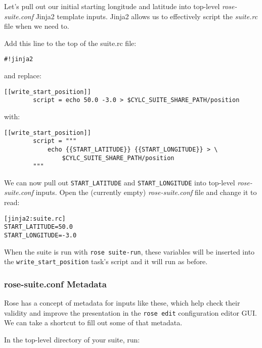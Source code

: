 Let's pull out our initial starting longitude and latitude into top-level {\em rose-suite.conf} Jinja2 template inputs. Jinja2 allows us to effectively script the {\em suite.rc} file when we need to.

Add this line to the top of the suite.rc file:

\lstset{language=suiterc}
\begin{lstlisting}[columns=fullflexible]
#!jinja2
\end{lstlisting}

and replace:

\lstset{language=suiterc}
\begin{lstlisting}[columns=fullflexible]
    [[write_start_position]]
        script = echo 50.0 -3.0 > $CYLC_SUITE_SHARE_PATH/position
\end{lstlisting}

with:

\lstset{language=suiterc}
\begin{lstlisting}[columns=fullflexible]
    [[write_start_position]]
        script = """
            echo {{START_LATITUDE}} {{START_LONGITUDE}} > \
                $CYLC_SUITE_SHARE_PATH/position
        """
\end{lstlisting}

We can now pull out \lstinline{START_LATITUDE} and \lstinline{START_LONGITUDE} into top-level {\em rose-suite.conf} inputs. Open the (currently empty) {\em rose-suite.conf} file and change it to read:

\lstset{language=suiterc}
\begin{lstlisting}[columns=fullflexible]
[jinja2:suite.rc]
START_LATITUDE=50.0
START_LONGITUDE=-3.0
\end{lstlisting}

When the suite is run with \lstinline{rose suite-run}, these variables will be inserted into the \lstinline{write_start_position} task's script and it will run as before.

\subsubsection{rose-suite.conf Metadata}

Rose has a concept of metadata for inputs like these, which help check their validity and improve the presentation in the \lstinline{rose edit} configuration editor GUI. We can take a shortcut to fill out some of that metadata.

In the top-level directory of your suite, run:

